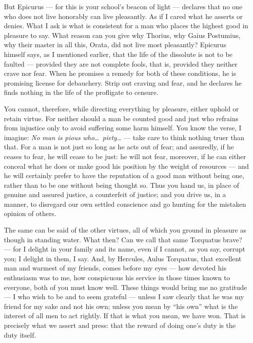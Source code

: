  But Epicurus — for this is your school's beacon of light — declares that no one who does not live honorably can live pleasantly. As if I cared what he asserts or denies. What I ask is what is consistent for a man who places the highest good in pleasure to say. What reason can you give why Thorius, why Gaius Postumius, why their master in all this, Orata, did not live most pleasantly? Epicurus himself says, as I mentioned earlier, that the life of the dissolute is not to be faulted — provided they are not complete fools, that is, provided they neither crave nor fear. When he promises a remedy for both of these conditions, he is promising license for debauchery. Strip out craving and fear, and he declares he finds nothing in the life of the profligate to censure.

 You cannot, therefore, while directing everything by pleasure, either uphold or retain virtue. For neither should a man be counted good and just who refrains from injustice only to avoid suffering some harm himself. You know the verse, I imagine: \textit{No man is pious who\ldots\ piety\ldots} — take care to think nothing truer than that. For a man is not just so long as he acts out of fear; and assuredly, if he ceases to fear, he will cease to be just: he will not fear, moreover, if he can either conceal what he does or make good his position by the weight of resources — and he will certainly prefer to have the reputation of a good man without being one, rather than to be one without being thought so. Thus you hand us, in place of genuine and assured justice, a counterfeit of justice; and you drive us, in a manner, to disregard our own settled conscience and go hunting for the mistaken opinion of others.

 The same can be said of the other virtues, all of which you ground in pleasure as though in standing water. What then? Can we call that same Torquatus brave? — for I delight in your family and its name, even if I cannot, as you say, corrupt you; I delight in them, I say. And, by Hercules, Aulus Torquatus, that excellent man and warmest of my friends, comes before my eyes — how devoted his enthusiasm was to me, how conspicuous his service in those times known to everyone, both of you must know well. These things would bring me no gratitude — I who wish to be and to seem grateful — unless I saw clearly that he was my friend for my sake and not his own; unless you mean by ``his own'' what is the interest of all men to act rightly. If that is what you mean, we have won. That is precisely what we assert and press: that the reward of doing one's duty is the duty itself.

